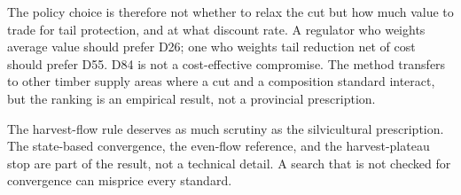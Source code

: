 The policy choice is therefore not whether to relax the cut but how much value to trade for tail
protection, and at what discount rate. A regulator who weights average value should prefer D26; one
who weights tail reduction net of cost should prefer D55. D84 is not a cost-effective compromise. The
method transfers to other timber supply areas where a cut and a composition standard interact, but
the ranking is an empirical result, not a provincial prescription.

The harvest-flow rule deserves as much scrutiny as the silvicultural prescription. The state-based
convergence, the even-flow reference, and the harvest-plateau stop are part of the result, not a
technical detail. A search that is not checked for convergence can misprice every standard.
